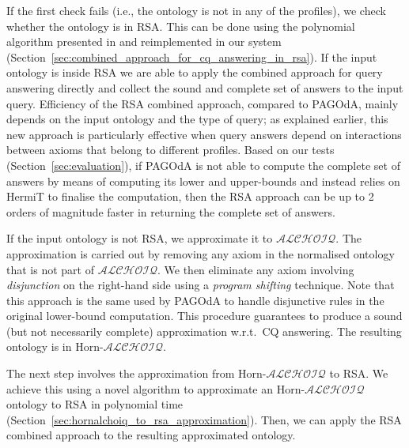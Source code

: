 \documentclass[runningheads]{llncs}
\newcommand{\alchoiq}{$\mathcal{ALCHOIQ}$\xspace}
\newcommand{\hornalchoiq}{Horn-\alchoiq\xspace}
\newcommand{\pagoda}{\mbox{PAGOdA}\xspace}
\newcommand{\hermit}{\mbox{HermiT}\xspace}
\begin{document}
If the first check fails (i.e., the ontology is not in any of the profiles), we check whether the ontology is in RSA.
This can be done using the polynomial algorithm presented in \cite{feier2015} and reimplemented in our system (Section~\ref{sec:combined_approach_for_cq_answering_in_rsa}).
If the input ontology is inside RSA we are able to apply the combined approach for query answering directly and collect the sound and complete set of answers to the input query.
Efficiency of the RSA combined approach, compared to \pagoda, mainly depends on the input ontology and the type of query;
as explained earlier, this new approach is particularly effective when query answers depend on interactions between axioms that belong to different profiles.
Based on our tests (Section~\ref{sec:evaluation}), if \pagoda is not able to compute the complete set of answers by means of computing its lower and upper-bounds and instead relies on \hermit to finalise the computation, then the RSA approach can be up to 2 orders of magnitude faster in returning the complete set of answers.

If the input ontology is not RSA, we approximate it to \alchoiq.
The approximation is carried out by removing any axiom in the normalised ontology that is not part of \alchoiq.
We then eliminate any axiom involving \emph{disjunction} on the right-hand side using a \emph{program shifting} technique.
Note that this approach is the same used by \pagoda to handle disjunctive rules in the original lower-bound computation.
This procedure guarantees to produce a sound (but not necessarily complete) approximation w.r.t.\ CQ answering.
The resulting ontology is in \hornalchoiq.

The next step involves the approximation from \hornalchoiq to RSA.
We achieve this using a novel algorithm to approximate an \hornalchoiq ontology to RSA in polynomial time (Section~\ref{sec:hornalchoiq_to_rsa_approximation}).
Then, we can apply the RSA combined approach to the resulting approximated ontology.
\end{document}
